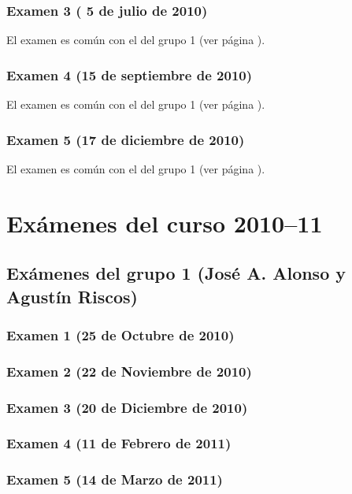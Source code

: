 \documentclass[a4paper,12pt,twoside]{book}
\begin{document}
\subsection{Examen 3 ( 5 de julio de 2010)}
El examen es común con el del grupo 1 (ver página \pageref{examen_09_10_1_7}).
\subsection{Examen 4 (15 de septiembre de 2010)}
El examen es común con el del grupo 1 (ver página \pageref{examen_09_10_1_8}).
\subsection{Examen 5 (17 de diciembre de 2010)}
El examen es común con el del grupo 1 (ver página \pageref{examen_09_10_1_9}).

\chapter{Exámenes del curso 2010--11}

\section{Exámenes del grupo 1 (José A. Alonso y Agustín Riscos)}
\subsection{Examen 1 (25 de Octubre de 2010)}
\subsection{Examen 2 (22 de Noviembre de 2010)}
\subsection{Examen 3 (20 de Diciembre de 2010)}
\subsection{Examen 4 (11 de Febrero de 2011)}
\label{examen_10_11_4_4}
\subsection{Examen 5 (14 de Marzo de 2011)}
\label{examen_10_11_4_5}
\end{document}
